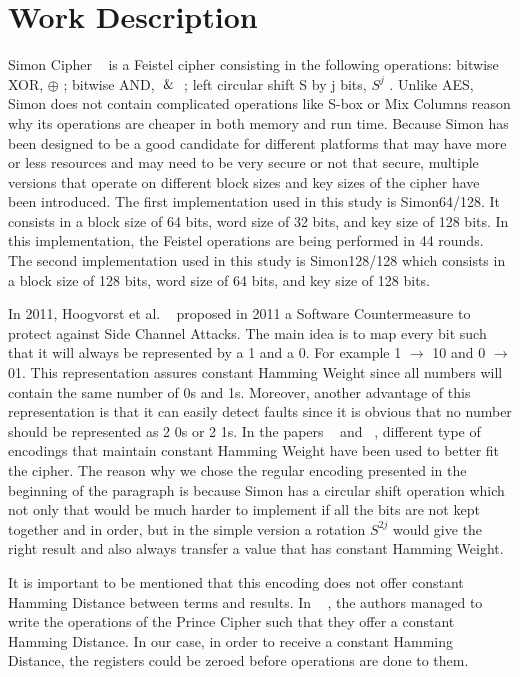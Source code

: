 \documentclass[conference]{IEEEtran}
\begin{document}
\section{Work Description}

Simon Cipher ~\cite{Beaulieu_Simon} is a Feistel cipher consisting in the following operations: bitwise XOR, $\oplus$ ; bitwise AND, $\And$ ; left circular shift S by j bits, $S^j$ . Unlike AES, Simon does not contain complicated operations like S-box or Mix Columns reason why its operations are cheaper in both memory and run time. Because Simon has been designed to be a good candidate for different platforms that may have more or less resources and may need to be very secure or not that secure, multiple versions that operate on different block sizes and key sizes of the cipher have been introduced. The first implementation used in this study is Simon64/128. It consists in a block size of 64 bits, word size of 32 bits, and key size of 128 bits. In this implementation, the Feistel operations are being performed in 44 rounds. The second implementation used in this study is Simon128/128 which consists in a block size of 128 bits, word size of 64 bits, and key size of 128 bits.

In 2011, Hoogvorst et al.  ~\cite{Hoogvorst} proposed in 2011 a Software Countermeasure to protect against Side Channel Attacks. The main idea is to map every bit such that it will always be represented by a 1 and a 0. For example 1 $\rightarrow$ 10 and 0 $\rightarrow$ 01. This representation assures constant Hamming Weight since all numbers will contain the same number of 0s and 1s. Moreover, another advantage of this representation is that it can easily detect faults since it is obvious that no number should be represented as 2 0s or 2 1s. In the papers ~\cite{BEPrince} and ~\cite{ServantAES}, different type of encodings that maintain constant Hamming Weight have been used to better fit the cipher. The reason why we chose the regular encoding presented in the beginning of the paragraph is because Simon has a circular shift operation which not only that would be much harder to implement if all the bits are not kept together and in order, but in the simple version a rotation $S^{2j}$ would give the right result and also always transfer a value that has constant Hamming Weight.

It is important to be mentioned that this encoding does not offer constant Hamming Distance between terms and results. In ~\cite{BEPrince} , the authors managed to write the operations of the Prince Cipher such that they offer a constant Hamming Distance. In our case, in order to receive a constant Hamming Distance, the registers could be zeroed before operations are done to them.
\end{document}
